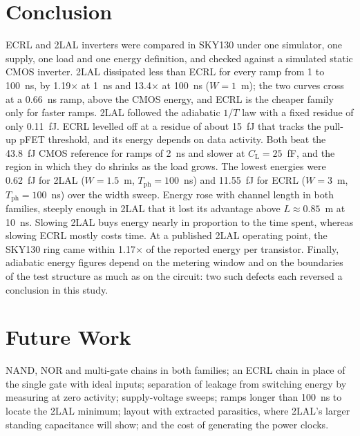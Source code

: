 \documentclass[conference]{IEEEtran}
\newcommand{\CL}{C_{\mathrm{L}}}
\newcommand{\Tph}{T_{\mathrm{ph}}}
\begin{document}
\section{Conclusion}
\label{sec:conclusion}
ECRL and 2LAL inverters were compared in SKY130 under one simulator, one
supply, one load and one energy definition, and checked against a simulated
static CMOS inverter. 2LAL dissipated less than ECRL for every ramp from 1 to
100~ns, by 1.19$\times$ at 1~ns and 13.4$\times$ at 100~ns ($W=1$~\textmu m);
the two curves cross at a 0.66~ns ramp, above the CMOS energy, and ECRL is
the cheaper family only for faster ramps. 2LAL followed the adiabatic $1/T$ law with a fixed residue of only 0.11~fJ. ECRL
levelled off at a residue of about 15~fJ that tracks the pull-up pFET
threshold, and its energy depends on data activity. Both beat the 43.8~fJ
CMOS reference for ramps of 2~ns and slower at $\CL=25$~fF, and the region
in which they do shrinks as the load grows. The lowest energies were 0.62~fJ
for 2LAL ($W=1.5$~\textmu m, $\Tph=100$~ns) and 11.55~fJ for ECRL
($W=3$~\textmu m, $\Tph=100$~ns) over the width sweep. Energy rose with channel
length in both families, steeply enough in 2LAL that it lost its advantage
above $L\approx0.85$~\textmu m at 10~ns. Slowing 2LAL buys energy nearly in
proportion to the time spent, whereas slowing ECRL mostly costs time. At a published
2LAL operating point, the SKY130 ring came within 1.17$\times$ of the
reported energy per transistor. Finally, adiabatic energy figures depend on
the metering window and on the boundaries of the test structure as much as on
the circuit: two such defects each reversed a conclusion in this study.

\section*{Future Work}
NAND, NOR and multi-gate chains in both families; an ECRL chain in place of
the single gate with ideal inputs; separation of leakage from switching
energy by measuring at zero activity; supply-voltage sweeps; ramps longer
than 100~ns to locate the 2LAL minimum; layout with extracted parasitics,
where 2LAL's larger standing capacitance will show; and the cost of
generating the power clocks.



\end{document}
